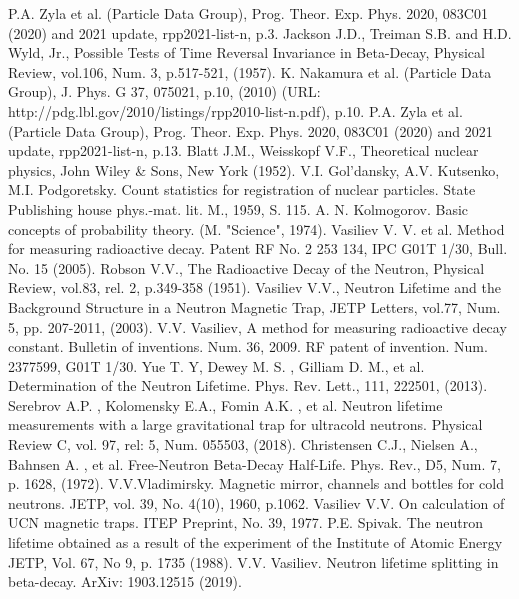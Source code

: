 \documentclass[article]{elsarticle}
\begin{document}
\begin{thebibliography}{99}
P.A. Zyla et al. (Particle Data Group), Prog. Theor. Exp. Phys. 2020, 083C01 (2020) and 2021 update, rpp2021-list-n, p.3.
Jackson J.D., Treiman S.B. and H.D. Wyld, Jr., Possible Tests of Time Reversal 
Invariance in Beta-Decay, Physical Review, vol.106, Num. 3, p.517-521, (1957). 
K. Nakamura et al. (Particle Data Group), J. Phys. G 37, 075021, p.10, (2010) (URL: http://pdg.lbl.gov/2010/listings/rpp2010-list-n.pdf), p.10.
P.A. Zyla et al. (Particle Data Group), Prog. Theor. Exp. Phys. 2020, 083C01 (2020) and 2021 update, rpp2021-list-n, p.13.
Blatt J.M., Weisskopf V.F., Theoretical nuclear physics, John Wiley \& Sons, 
New York (1952).
V.I. Gol'dansky, A.V. Kutsenko, M.I. Podgoretsky. Count statistics for registration of nuclear particles. State Publishing house phys.-mat. lit. M., 1959, S. 115.
A. N. Kolmogorov. Basic concepts of probability theory. (M. "Science", 1974).
Vasiliev V. V. et al. Method for measuring radioactive decay. Patent RF No. 2 253 134, IPC G01T 1/30, Bull. No. 15 (2005).
Robson V.V., The Radioactive Decay of the Neutron, Physical Review, vol.83, rel. 2, p.349-358 (1951).
Vasiliev V.V., Neutron Lifetime and the Background Structure in a Neutron Magnetic Trap, JETP Letters, vol.77, Num. 5, pp. 207-2011, (2003).
V.V. Vasiliev, A method for measuring radioactive decay constant. Bulletin of inventions. Num. 36, 2009. RF patent of invention. Num. 2377599, G01T 1/30.
Yue T. Y, Dewey M. S. , Gilliam D. M., et al. Determination of the Neutron Lifetime. Phys. Rev. Lett., 111, 222501, (2013).
Serebrov A.P. , Kolomensky E.A., Fomin A.K. , et al. Neutron lifetime measurements with a large gravitational trap for ultracold neutrons. Physical Review C, vol. 97, rel: 5, Num. 055503, (2018).
Christensen C.J., Nielsen A., Bahnsen A. , et al. Free-Neutron Beta-Decay Half-Life. 
Phys. Rev., D5, Num. 7, p. 1628, (1972).
V.V.Vladimirsky. Magnetic mirror, channels and bottles for cold neutrons. JETP, vol. 39, No. 4(10), 1960, p.1062.
Vasiliev V.V. On calculation of UCN magnetic traps. ITEP Preprint, No. 39, 1977. 
P.E. Spivak. The neutron lifetime obtained as a result of the experiment of the Institute of Atomic Energy JETP, Vol. 67, No 9, p. 1735 (1988).
V.V. Vasiliev. Neutron lifetime splitting in beta-decay. ArXiv: 1903.12515 (2019).

\end{thebibliography}
\end{document}
